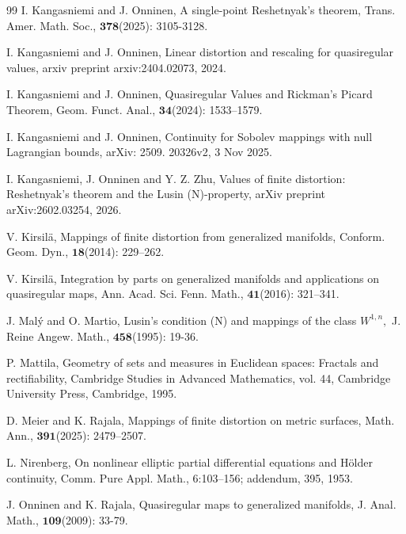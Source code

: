 \documentclass[11pt,twoside]{article}
\theoremstyle{definition}
\theoremstyle{remark}
\begin{document}
\begin{thebibliography}{99}
I. Kangasniemi and J. Onninen, A single-point Reshetnyak’s theorem, Trans. Amer. Math. Soc., $\mathbf{378}$(2025): 3105-3128.  



I. Kangasniemi and  J. Onninen, Linear distortion and rescaling for quasiregular values, arxiv preprint arxiv:2404.02073, 2024.

I. Kangasniemi and J. Onninen, Quasiregular Values and Rickman's Picard Theorem, Geom. Funct. Anal., $\mathbf{34}$(2024): 1533–1579.

I. Kangasniemi and J. Onninen, Continuity for Sobolev mappings with null Lagrangian bounds,  arXiv: 2509. 20326v2, 3 Nov 2025.

I. Kangasniemi, J. Onninen and Y. Z. Zhu, Values of finite distortion: Reshetnyak's theorem and the Lusin (N)-property,  arXiv preprint arXiv:2602.03254, 2026.





V. Kirsil\"{a}, Mappings of finite distortion from generalized manifolds, Conform. Geom. Dyn., $\mathbf{18}$(2014): 229–262.


V. Kirsil\"{a}, Integration by parts on generalized manifolds and applications on quasiregular maps, Ann. Acad. Sci. Fenn. Math., $\mathbf{41}$(2016): 321–341.


J. Mal\'{y} and O. Martio, Lusin's condition (N) and mappings of the class $W^{1,n},$ J. Reine Angew. Math., $\mathbf{458}$(1995): 19-36.



P. Mattila, Geometry of sets and measures in Euclidean spaces: Fractals and rectifiability, Cambridge Studies in Advanced Mathematics, vol. 44, Cambridge University Press,
Cambridge, 1995.






D. Meier and K. Rajala, Mappings of finite distortion on metric surfaces, Math. Ann., $\mathbf{391}$(2025): 2479–2507. 

L. Nirenberg, On nonlinear elliptic partial differential equations and H\"{o}lder continuity, Comm. Pure Appl. Math., 6:103–156; addendum, 395, 1953.

 J. Onninen and K. Rajala, Quasiregular maps to generalized manifolds, J. Anal. Math.,  $\mathbf{109}$(2009): 33-79.



\end{thebibliography}
\end{document}
